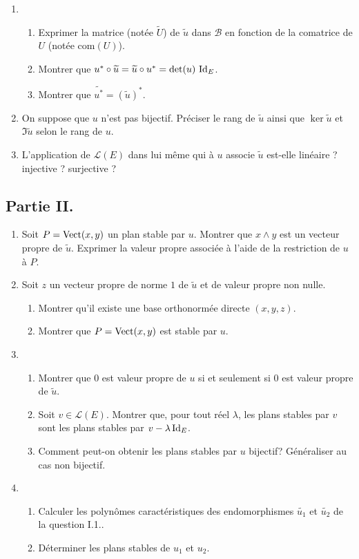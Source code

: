 \begin{enumerate}
\begin{enumerate}
\end{enumerate}
\item 
\begin{enumerate}
 \item Exprimer la matrice (notée $\widetilde{U}$) de $\widetilde{u}$ dans $\mathcal{B}$ en fonction de la comatrice de $U$ (notée $\mathrm{com}(U)$).
 \item Montrer que $u^* \circ \widetilde{u} = \widetilde{u} \circ u^{*} = \det(u)\,\operatorname{Id}_E$.
 \item Montrer que $\widetilde{u^*} = (\widetilde{u})^*$.
\end{enumerate}
 \item On suppose que $u$ n'est pas bijectif. Préciser le rang de $\widetilde{u}$ ainsi que $\ker \widetilde{u}$ et $\Im \widetilde{u}$ selon le rang de $u$.
\item L'application de $\mathcal{L}(E)$ dans lui même qui à $u$ associe $\widetilde{u}$ est-elle linéaire ? injective ? surjective ?
\end{enumerate}
\subsection*{Partie II.}
\begin{enumerate}
 \item Soit $P=\operatorname{Vect}(x,y)$ un plan stable par $u$.\newline
Montrer que $x\wedge y$ est un vecteur propre de $\widetilde{u}$. Exprimer la valeur propre associée à l'aide de la restriction de $u$ à $P$.
\item Soit $z$ un vecteur propre de norme $1$ de $\widetilde{u}$ et de valeur propre non nulle.
\begin{enumerate}
 \item Montrer qu'il existe une base orthonormée directe $(x,y,z)$.
 \item Montrer que $P=\operatorname{Vect}(x,y)$ est stable par $u$.
\end{enumerate}
\item
\begin{enumerate}
 \item Montrer que $0$ est valeur propre de $u$ si et seulement si $0$ est valeur propre de $\widetilde{u}$.
 \item Soit $v\in \mathcal{L}(E)$. Montrer que, pour tout réel $\lambda$, les plans stables par $v$ sont les plans stables par $v-\lambda \operatorname{Id}_E$.
 \item Comment peut-on obtenir les plans stables par $u$ bijectif? Généraliser au cas non bijectif.
\end{enumerate}
\item 
\begin{enumerate}
\item Calculer les polynômes caractéristiques des endomorphismes $\widetilde{u_1}$ et $\widetilde{u_2}$ de la question I.1..
\item Déterminer les plans stables de $u_1$ et $u_2$.
\end{enumerate}
\end{enumerate}
